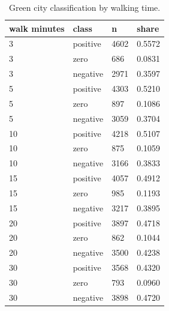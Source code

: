 \begin{table}[t]\centering
\caption{Green city classification by walking time.}\label{tab:class}
\begin{tabular}{llll}
\hline
walk minutes & class & n & share \\
\hline
 3 & positive & 4602 & 0.5572 \\
 3 & zero &  686 & 0.0831 \\
 3 & negative & 2971 & 0.3597 \\
 5 & positive & 4303 & 0.5210 \\
 5 & zero &  897 & 0.1086 \\
 5 & negative & 3059 & 0.3704 \\
10 & positive & 4218 & 0.5107 \\
10 & zero &  875 & 0.1059 \\
10 & negative & 3166 & 0.3833 \\
15 & positive & 4057 & 0.4912 \\
15 & zero &  985 & 0.1193 \\
15 & negative & 3217 & 0.3895 \\
20 & positive & 3897 & 0.4718 \\
20 & zero &  862 & 0.1044 \\
20 & negative & 3500 & 0.4238 \\
30 & positive & 3568 & 0.4320 \\
30 & zero &  793 & 0.0960 \\
30 & negative & 3898 & 0.4720 \\
\hline
\end{tabular}\end{table}
